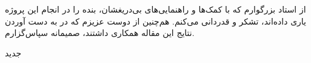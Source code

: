 


\begin{center}
\end{center}

از استاد بزرگوارم که با کمک‌ها و راهنمایی‌های بی‌دریغشان، بنده را در انجام این پروژه یاری داده‌اند، تشکر و قدردانی می‌کنم.
هم‌چنین از دوست عزیزم که در به دست آوردن نتایج این مقاله همکاری داشتند، صمیمانه سپاس‌گزارم.

‌جدید
